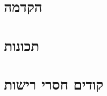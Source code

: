 \documentclass[]{article}
\def\insert#1{}
\begin{document}
\def\lecnum{6}
\def\topcis{
אלגוריתמים חמדניים, עצי הופמן
}

\section*{הקדמה}
\insert{intro}
\section*{תכונות}
\insert{properties}
\section*{קודים חסרי רישות}
\insert{prefix}
\end{document}
